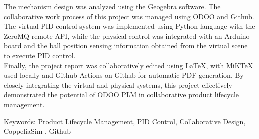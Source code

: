 \justifying\fontsize{14pt}{16pt}\sectionef\hspace{12pt}\quad The mechanism design was analyzed using the Geogebra software. The collaborative work process of this project was managed using ODOO and Github. The virtual PID control system was implemented using Python language with the ZeroMQ remote API, while the physical control was integrated with an Arduino board and the ball position sensing information obtained from the virtual scene to execute PID control.\\

\justifying\fontsize{14pt}{16pt}\sectionef\hspace{12pt}\quad Finally, the project report was collaboratively edited using LaTeX, with MiKTeX used locally and Github Actions on Github for automatic PDF generation. By closely integrating the virtual and physical systems, this project effectively demonstrated the potential of ODOO PLM in collaborative product lifecycle management.\\

\vspace{3cm}
\begin{hangparas}{1.5cm}{1}
Keywords: Product Lifecycle Management, PID Control, Collaborative Design, CoppeliaSim , Github
\end{hangparas}



